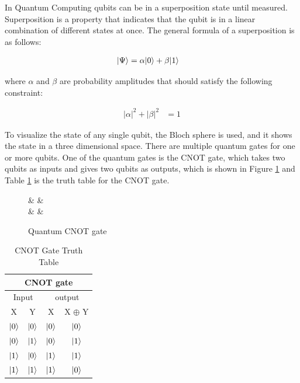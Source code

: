 \documentclass[12pt,a4paper]{article}
\DeclarePairedDelimiter\ket{\lvert}{\rangle}
\begin{document}
	In Quantum Computing qubits can be in a superposition state until measured. Superposition is a property that indicates that the qubit is in a linear combination of different states at once. The general formula of a superposition is as follows:
	
	\begin{align*}
		\ket{\Psi} &= \alpha\ket{0} + \beta\ket{1} 
	\end{align*}
	
	where $\alpha$ and $\beta$ are probability amplitudes that should satisfy the following constraint:
	
	\begin{align*}
		|\alpha|^2 + |\beta|^2 &= 1
	\end{align*}
	
	To visualize the state of any single qubit, the Bloch sphere is used, and it shows the state in a three dimensional space. There are multiple quantum gates for one or more qubits. One of the quantum gates is the CNOT gate, which takes two qubits as inputs and gives two qubits as outputs, which is shown in Figure \ref{fig:1} and Table \ref{table:1} is the truth table for the CNOT gate.
	
	\begin{figure}[H]
		\centering
		\begin{quantikz}[row sep={9mm,between origins}]
			 &  &  \\
			 & \targ{} &  \oplus {}
		\end{quantikz}
		\caption{Quantum CNOT gate}
		\label{fig:1}
	\end{figure}
	
	\begin{table}[H]
		\centering
		\begin{tabular}{|c c c c|} 
			\hline
			\multicolumn{4}{|c|}{CNOT gate} \\ [0.5ex]
			\hline
			\multicolumn{2}{|c|}{Input} & \multicolumn{2}{c|}{output} \\ [0.5ex] 
			\hline
			\multicolumn{1}{|c|}{X} & \multicolumn{1}{|c|}{Y} & \multicolumn{1}{|c|}{X} & \multicolumn{1}{|c|}{X $\oplus$ Y} \\ [0.5ex] 
			\hline
			\multicolumn{1}{|c}{ $\ket{0}$} & \multicolumn{1}{|c|}{ $\ket{0}$} & \multicolumn{1}{|c|}{ $\ket{0}$} & \multicolumn{1}{c|}{ $\ket{0}$} \\ 
			\hline
			\multicolumn{1}{|c}{ $\ket{0}$} & \multicolumn{1}{|c|}{ $\ket{1}$} & \multicolumn{1}{|c|}{ $\ket{0}$} & \multicolumn{1}{c|}{$\ket{1}$} \\ 
			\hline
			\multicolumn{1}{|c}{$\ket{1}$} & \multicolumn{1}{|c|}{ $\ket{0}$} & \multicolumn{1}{|c|}{$\ket{1}$} & \multicolumn{1}{c|}{$\ket{1}$} \\ 
			\hline
			\multicolumn{1}{|c}{$\ket{1}$} & \multicolumn{1}{|c|}{$\ket{1}$} & \multicolumn{1}{|c|}{$\ket{1}$} & \multicolumn{1}{c|}{ $\ket{0}$} \\ 
			\hline
		\end{tabular}
		\caption{CNOT Gate Truth Table}
		\label{table:1}
	\end{table}
	
\end{document}
